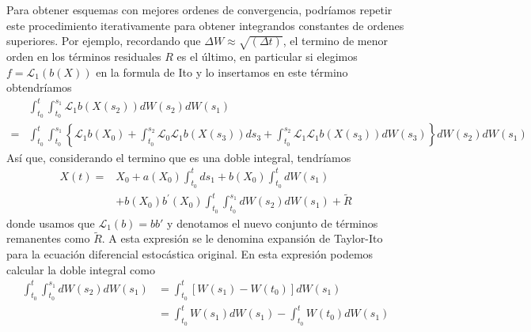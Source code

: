 \documentclass{article}
\begin{document}
\noindent 
Para obtener esquemas con mejores ordenes de convergencia, podríamos repetir este procedimiento iterativamente para obtener integrandos constantes de ordenes superiores.  Por ejemplo, recordando que $\Delta W \approx \sqrt{(\Delta t)}$, el termino de menor orden en los términos residuales $R$ es el último, en particular si elegimos $f=\mathcal{L}_1(b(X))$ en la formula de Ito y lo insertamos en este término obtendríamos
\begin{equation}\begin{aligned}
& \int_{t_{0}}^{t} \int_{t_{0}}^{s_{1}} \mathcal{L}_{1} b\left(X\left(s_{2}\right)\right) d W\left(s_{2}\right) d W\left(s_{1}\right) \\
=& \int_{t_{0}}^{t} \int_{t_{0}}^{s_{1}}\left\{\mathcal{L}_{1} b\left(X_0\right)+\int_{t_{0}}^{s_{2}} \mathcal{L}_{0} \mathcal{L}_{1} b\left(X\left(s_{3}\right)\right) d s_{3}+\int_{t_{0}}^{s_{2}} \mathcal{L}_{1} \mathcal{L}_{1} b\left(X\left(s_{3}\right)\right) d W\left(s_{3}\right)\right\} d W\left(s_{2}\right) d W\left(s_{1}\right)
\end{aligned}\end{equation}
Así que, considerando el termino que es una doble integral, tendríamos 
\begin{equation}\begin{aligned}
X(t)=& X_0+a\left(X_0\right) \int_{t_{0}}^{t} d s_{1}+b\left(X_0\right) \int_{t_{0}}^{t} d W\left(s_{1}\right) \\
&+b\left(X_0\right) b^{\prime}\left(X_{0}\right) \int_{t_{0}}^{t} \int_{t_{0}}^{s_{1}} d W\left(s_{2}\right) d W\left(s_{1}\right)+\tilde{R}
\end{aligned}\end{equation}
donde usamos que $\mathcal{L}_1(b)=bb'$ y denotamos el nuevo conjunto de términos remanentes como $\tilde{R}$. A esta expresión se le denomina expansión de Taylor-Ito para la ecuación diferencial estocástica original. En esta expresión podemos calcular la doble integral como 
\begin{equation}\begin{aligned}
\int_{t_{0}}^{t} \int_{t_{0}}^{s_{1}} d W\left(s_{2}\right) d W\left(s_{1}\right) &=\int_{t_{0}}^{t}\left[W\left(s_{1}\right)-W\left(t_{0}\right)\right] d W\left(s_{1}\right) \\
&=\int_{t_{0}}^{t} W\left(s_{1}\right) d W\left(s_{1}\right)-\int_{t_{0}}^{t} W\left(t_{0}\right) d W\left(s_{1}\right) \\
\end{aligned}\end{equation}
\end{document}
